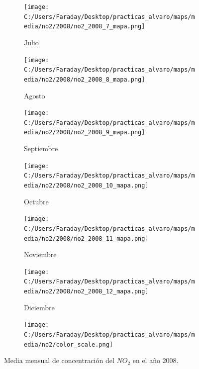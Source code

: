 \documentclass[12pt]{article}
\begin{document}
\begin{figure}[H]
\begin{subfigure}[H]{0.15\textwidth}
\texttt{[image: C:/Users/Faraday/Desktop/practicas\_alvaro/maps/media/no2/2008/no2\_2008\_7\_mapa.png]}
\captionsetup{labelformat=empty}
\caption{Julio}
\label{fig:map-no2-2008-7}
\end{subfigure}
%
\begin{subfigure}[H]{0.15\textwidth}
\texttt{[image: C:/Users/Faraday/Desktop/practicas\_alvaro/maps/media/no2/2008/no2\_2008\_8\_mapa.png]}
\captionsetup{labelformat=empty}
\caption{Agosto}
\label{fig:map-no2-2008-8}
\end{subfigure}
%
\begin{subfigure}[H]{0.15\textwidth}
\texttt{[image: C:/Users/Faraday/Desktop/practicas\_alvaro/maps/media/no2/2008/no2\_2008\_9\_mapa.png]}
\captionsetup{labelformat=empty}
\caption{Septiembre}
\label{fig:map-no2-2008-9}
\end{subfigure}
%
\begin{subfigure}[H]{0.15\textwidth}
\texttt{[image: C:/Users/Faraday/Desktop/practicas\_alvaro/maps/media/no2/2008/no2\_2008\_10\_mapa.png]}
\captionsetup{labelformat=empty}
\caption{Octubre}
\label{fig:map-no2-2008-10}
\end{subfigure}
%
\begin{subfigure}[H]{0.15\textwidth}
\texttt{[image: C:/Users/Faraday/Desktop/practicas\_alvaro/maps/media/no2/2008/no2\_2008\_11\_mapa.png]}
\captionsetup{labelformat=empty}
\caption{Noviembre}
\label{fig:map-no2-2008-11}
\end{subfigure}
%
\begin{subfigure}[H]{0.15\textwidth}
\texttt{[image: C:/Users/Faraday/Desktop/practicas\_alvaro/maps/media/no2/2008/no2\_2008\_12\_mapa.png]}
\captionsetup{labelformat=empty}
\caption{Diciembre}
\label{fig:map-no2-2008-12}
\end{subfigure}

\begin{subfigure}[H]{0.45\textwidth}
\texttt{[image: C:/Users/Faraday/Desktop/practicas\_alvaro/maps/media/no2/color\_scale.png]}
\captionsetup{labelformat=empty}
\caption{}
\end{subfigure}

\vspace*{-7mm}
\caption{Media mensual de concentración del $NO_{2}$ en el año 2008.}
\label{fig:map-no2-2008}
\end{figure}
\end{document}

